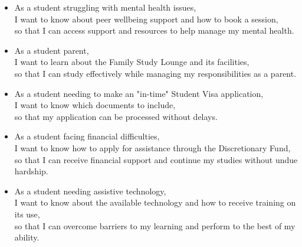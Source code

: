 \documentclass{l4proj}
\begin{document}
\begin{appendices}
\begin{itemize}
    \item As a student struggling with mental health issues, \\I want to know about peer wellbeing support and how to book a session, \\so that I can access support and resources to help manage my mental health.
    \vspace{1em}
    \item As a student parent, \\I want to learn about the Family Study Lounge and its facilities, \\so that I can study effectively while managing my responsibilities as a parent.
    \vspace{1em}
    \item As a student needing to make an "in-time" Student Visa application, \\I want to know which documents to include, \\so that my application can be processed without delays.
    \vspace{1em}
    \item As a student facing financial difficulties, \\I want to know how to apply for assistance through the Discretionary Fund, \\so that I can receive financial support and continue my studies without undue hardship.
    \vspace{1em}
    \item As a student needing assistive technology, \\I want to know about the available technology and how to receive training on its use, \\so that I can overcome barriers to my learning and perform to the best of my ability.
    
\end{itemize}


\end{appendices}
\end{document}
